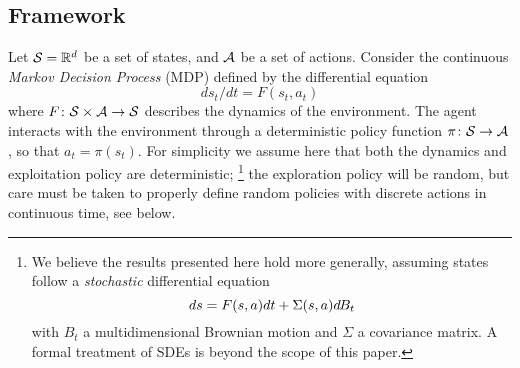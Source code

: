 \subsection{Framework}





      
Let ${\cal S} = \mathbb{R}^d$ be a set of states, and ${\cal A}$ be a set of
actions. Consider the continuous \emph{Markov Decision Process} (MDP) defined by the differential equation %
        \begin{equation}
	\label{eq:diffusion}
	ds_t/dt = F(s_t, a_t) %
              \end{equation}
where $F\colon {\cal S}\times{\cal A}\rightarrow {\cal S}$ describes
the dynamics of the environment. The agent interacts with the environment through a deterministic policy function
$\pi \colon {\cal S} \rightarrow {\cal A}$, so that $a_t=\pi(s_t)$. 
For simplicity we assume here that both the dynamics and exploitation policy are
deterministic; \footnote{
      We believe the results presented here hold more
      generally, assuming states
      follow a \emph{stochastic} differential equation \begin{equation}
	      ds = F(s, a)dt  + \Sigma(s, a)d\hspace{-.1em}B_t
	      \label{eq:sde}
      \end{equation} with
      $B_t$ a multidimensional Brownian motion and $\Sigma$ a covariance matrix. A
      formal treatment of SDEs is beyond the scope of this paper.}
 the exploration policy will be random, but care must be
taken to properly define random policies with
discrete actions in continuous time, see below.

